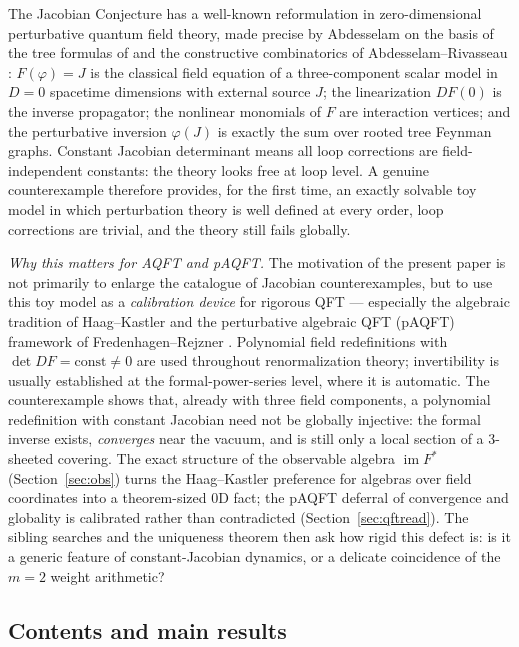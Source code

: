 \documentclass[11pt]{article}
\theoremstyle{definition}
\theoremstyle{remark}
\newcommand{\im}{\operatorname{im}}
\begin{document}
The Jacobian Conjecture has a well-known reformulation in
zero-dimensional perturbative quantum field theory, made precise by
Abdesselam \cite{Abd03} on the basis of the tree formulas of
\cite{BCW82,Wri87} and the constructive combinatorics of
Abdesselam--Rivasseau \cite{AR95}: $F(\varphi)=J$ is the classical field
equation of a three-component scalar model in $D=0$ spacetime dimensions
with external source $J$; the linearization $DF(0)$ is the inverse
propagator; the nonlinear monomials of $F$ are interaction vertices; and
the perturbative inversion $\varphi(J)$ is exactly the sum over rooted
tree Feynman graphs. Constant Jacobian determinant means all loop
corrections are field-independent constants: the theory looks free at
loop level. A genuine counterexample therefore provides, for the first
time, an exactly solvable toy model in which perturbation theory is well
defined at every order, loop corrections are trivial, and the theory
still fails globally.

\emph{Why this matters for AQFT and pAQFT.} The motivation of the present
paper is not primarily to enlarge the catalogue of Jacobian
counterexamples, but to use this toy model as a \emph{calibration device}
for rigorous QFT --- especially the algebraic tradition of
Haag--Kastler \cite{HK64} and the perturbative algebraic QFT (pAQFT)
framework of Fredenhagen--Rejzner \cite{FR12,FR16,Rej16}. Polynomial
field redefinitions with $\det DF=\mathrm{const}\neq 0$ are used
throughout renormalization theory; invertibility is usually established
at the formal-power-series level, where it is automatic. The
counterexample shows that, already with three field components, a
polynomial redefinition with constant Jacobian need not be globally
injective: the formal inverse exists, \emph{converges} near the vacuum,
and is still only a local section of a 3-sheeted covering. The exact
structure of the observable algebra $\im F^*$ (Section~\ref{sec:obs})
turns the Haag--Kastler preference for algebras over field coordinates
into a theorem-sized 0D fact; the pAQFT deferral of convergence and
globality is calibrated rather than contradicted
(Section~\ref{sec:qftread}). The sibling searches and the uniqueness
theorem then ask how rigid this defect is: is it a generic feature of
constant-Jacobian dynamics, or a delicate coincidence of the $m=2$
weight arithmetic?

\subsection{Contents and main results}
\end{document}
